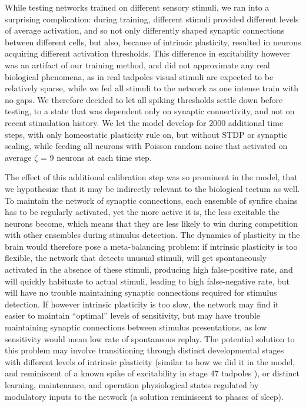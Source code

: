 \documentclass{article}
\begin{document}
While testing networks trained on different sensory stimuli, we ran into a surprising complication: during training, different stimuli provided different levels of average activation, and so not only differently shaped synaptic connections between different cells, but also, because of intrinsic plasticity, resulted in neurons acquiring different activation thresholds. This difference in excitability however was an artifact of our training method, and did not approximate any real biological phenomena, as in real tadpoles visual stimuli are expected to be relatively sparse, while we fed all stimuli to the network as one intense train with no gaps. We therefore decided to let all spiking thresholds settle down before testing, to a state that was dependent only on synaptic connectivity, and not on recent stimulation history. We let the model develop for 2000 additional time steps, with only homeostatic plasticity rule on, but without STDP or synaptic scaling, while feeding all neurons with Poisson random noise that activated on average $\zeta$ = 9 neurons at each time step. 

The effect of this additional calibration step was so prominent in the model, that we hypothesize that it may be indirectly relevant to the biological tectum as well. To maintain the network of synaptic connections, each ensemble of synfire chains has to be regularly activated, yet the more active it is, the less excitable the neurons become, which means that they are less likely to win during competition with other ensembles during stimulus detection. The dynamics of plasticity in the brain would therefore pose a meta-balancing problem: if intrinsic plasticity is too flexible, the network that detects unusual stimuli, will get spontaneously activated in the absence of these stimuli, producing high false-positive rate, and will quickly habituate to actual stimuli, leading to high false-negative rate, but will have no trouble maintaining synaptic connections required for stimulus detection. If however intrinsic plasticity is too slow, the network may find it easier to maintain “optimal” levels of sensitivity, but may have trouble maintaining synaptic connections between stimulus presentations, as low sensitivity would mean low rate of spontaneous replay. The potential solution to this problem may involve transitioning through distinct developmental stages with different levels of intrinsic plasticity (similar to how we did it in the model, and reminiscent of a known spike of excitability in stage 47 tadpoles \citep{hamodi2014,ciarleglio2015}), or distinct learning, maintenance, and operation physiological states regulated by modulatory inputs to the network (a solution reminiscent to phases of sleep).
\end{document}
